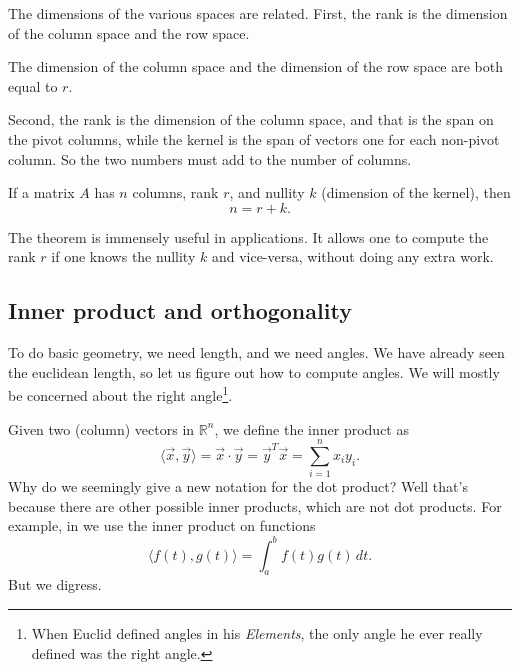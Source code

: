 The dimensions of the various spaces are related.  First, the rank
is the dimension of the column space and the row space.

\begin{theorem}[Rank]
The dimension of the column space and the dimension of the row space 
are both equal to $r$.
\end{theorem}

Second, the rank is the dimension of the column space, and that is
the span on the pivot columns, while the kernel is the span of vectors
one for each non-pivot column.  So the two numbers must add to the number of
columns.

\begin{theorem}
If a matrix $A$ has $n$ columns, rank $r$, and nullity $k$ (dimension of the
kernel), then
\begin{equation*}
n = r+k .
\end{equation*}
\end{theorem}

The theorem is immensely useful in applications.  It allows one to compute
the rank $r$ if one knows the nullity $k$ and vice-versa, without doing any
extra work.

\subsection{Inner product and orthogonality}

To do basic geometry, we need length, and we need angles.
We have already seen the euclidean length, so let us figure out how to
compute angles.  We will mostly be concerned
about the right angle\footnote{When Euclid defined angles in his
\emph{Elements}, the only angle he ever really defined was the right angle.}.

Given two (column) vectors in ${\mathbb{R}}^n$,
we define the inner product as
\begin{equation*}
\langle \vec{x} , \vec{y} \rangle =
\vec{x} \cdot \vec{y}
=
\vec{y}^T \vec{x}
=
\sum_{i=1}^n x_i y_i .
\end{equation*}
Why do we seemingly give a new notation for the dot product?  Well that's
because there are other possible inner products, which are not dot products.
For example, in  we use the  inner product on
functions 
\begin{equation*}
\langle f(t) , g(t) \rangle =
\int_{a}^{b}
f(t) g(t) \, dt .
\end{equation*}
But we digress.

